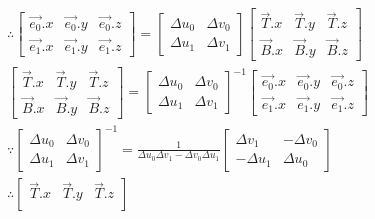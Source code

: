 \begin{gather*}
    \therefore \begin{bmatrix}
        \overrightarrow{e_{0}}.x & \overrightarrow{e_{0}}.y & \overrightarrow{e_{0}}.z \\ 
        \overrightarrow{e_{1}}.x & \overrightarrow{e_{1}}.y & \overrightarrow{e_{1}}.z  
    \end{bmatrix} = \begin{bmatrix}
        \Delta u_{0} & \Delta v_{0} \\ 
        \Delta u_{1} & \Delta v_{1}
    \end{bmatrix} \begin{bmatrix}
        \overrightarrow{T}.x & \overrightarrow{T}.y & \overrightarrow{T}.z \\ 
        \overrightarrow{B}.x & \overrightarrow{B}.y & \overrightarrow{B}.z  
    \end{bmatrix} \\ 
    \begin{bmatrix}
        \overrightarrow{T}.x & \overrightarrow{T}.y & \overrightarrow{T}.z \\ 
        \overrightarrow{B}.x & \overrightarrow{B}.y & \overrightarrow{B}.z  
    \end{bmatrix} = \begin{bmatrix}
        \Delta u_{0} & \Delta v_{0} \\ 
        \Delta u_{1} & \Delta v_{1}
    \end{bmatrix}^{-1} \begin{bmatrix}
        \overrightarrow{e_{0}}.x & \overrightarrow{e_{0}}.y & \overrightarrow{e_{0}}.z \\ 
        \overrightarrow{e_{1}}.x & \overrightarrow{e_{1}}.y & \overrightarrow{e_{1}}.z  
    \end{bmatrix} \\ 
    \because  \begin{bmatrix}
        \Delta u_{0} & \Delta v_{0} \\ 
        \Delta u_{1} & \Delta v_{1}
    \end{bmatrix}^{-1} = \frac{1}{\Delta u_{0} \Delta v_{1} - \Delta v_{0} \Delta u_{1}} \begin{bmatrix}
        \Delta v_{1} & -\Delta v_{0} \\ 
        -\Delta u_{1} & \Delta u_{0}
    \end{bmatrix} \\ 
    \therefore \begin{bmatrix}
        \overrightarrow{T}.x & \overrightarrow{T}.y & \overrightarrow{T}.z \\ 

\end{bmatrix}
\end{gather*}
